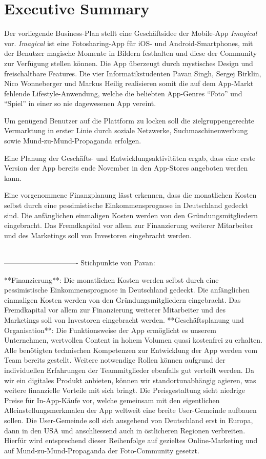 \chapter{Executive Summary}

Der vorliegende Business-Plan stellt eine Geschäftsidee der Mobile-App \textit{Imagical} vor.
\textit{Imagical} ist eine Fotosharing-App für iOS- und Android-Smartphones, mit der Benutzer magische Momente in Bildern festhalten und diese der Community zur Verfügung stellen können. 
Die App überzeugt durch mystisches Design und freischaltbare Features.
Die vier Informatikstudenten Pavan Singh, Sergej Birklin, Nico Wonneberger und Markus Heilig realisieren somit die auf dem App-Markt fehlende Lifestyle-Anwendung, welche die beliebten App-Genres ``Foto'' und ``Spiel'' in einer so nie dagewesenen App vereint.

Um genügend Benutzer auf die Plattform zu locken soll die zielgruppengerechte Vermarktung in erster Linie durch soziale Netzwerke, Suchmaschinenwerbung sowie Mund-zu-Mund-Propaganda erfolgen. 

Eine Planung der Geschäfts- und Entwicklungsaktivitäten ergab, dass eine erste Version der App bereits ende November in den App-Stores angeboten werden kann.

Eine vorgenommene Finanzplanung lässt erkennen, dass die monatlichen Kosten selbst durch eine pessimistische Einkommensprognose in Deutschland gedeckt sind. Die anfänglichen einmaligen Kosten werden von den Gründungsmitgliedern eingebracht. Das Fremdkapital vor allem zur Finanzierung weiterer Mitarbeiter und des Marketings soll von Investoren eingebracht werden.




\mbox{} \\ -------------------------------
Stichpunkte von Pavan:

**Finanzierung**: Die monatlichen Kosten werden selbst durch eine pessimistische Einkommensprognose in Deutschland gedeckt. Die anfänglichen einmaligen Kosten werden von den Gründungsmitgliedern eingebracht. Das Fremdkapital vor allem zur Finanzierung weiterer Mitarbeiter und des Marketings soll von Investoren eingebracht werden.
**Geschäftsplanung und Organisation**: Die Funktionsweise der App ermöglicht es unserem Unternehmen, wertvollen Content in hohem Volumen quasi kostenfrei zu erhalten. Alle benötigten technischen Kompetenzen zur Entwicklung der App werden vom Team bereits gestellt. Weitere notwendige Rollen können aufgrund der individuellen Erfahrungen der Teammitglieder ebenfalls gut verteilt werden. Da wir ein digitales Produkt anbieten, können wir standortunabhängig agieren, was weitere finanzielle Vorteile mit sich bringt.
Die Preisgestaltung sieht niedrige Preise für In-App-Käufe vor, welche gemeinsam mit den eigentlichen Alleinstellungsmerkmalen der App weltweit eine breite User-Gemeinde aufbauen sollen. Die User-Gemeinde soll sich ausgehend von Deutschland erst in Europa, dann in den USA und anschliessend auch in östlicheren Regionen verbreiten. Hierfür wird entsprechend dieser Reihenfolge auf gezieltes Online-Marketing und auf Mund-zu-Mund-Propaganda der Foto-Community gesetzt.
